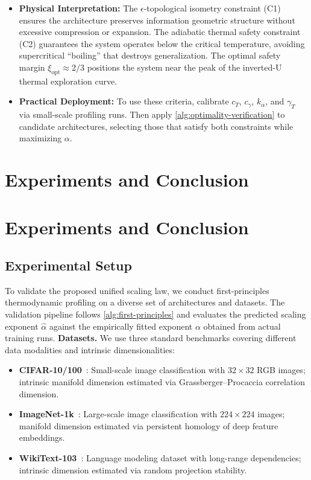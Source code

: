 \documentclass[11pt, a4paper]{article}
\theoremstyle{definition}
\begin{document}
\begin{itemize}
 \item \textbf{Physical Interpretation:} The $\epsilon$-topological isometry constraint (C1) ensures the architecture preserves information geometric structure without excessive compression or expansion. The adiabatic thermal safety constraint (C2) guarantees the system operates below the critical temperature, avoiding supercritical ``boiling'' that destroys generalization. The optimal safety margin $\xi_{\text{opt}} \approx 2/3$ positions the system near the peak of the inverted-U thermal exploration curve.
 \item \textbf{Practical Deployment:} To use these criteria, calibrate $c_T$, $c_\gamma$, $k_\alpha$, and $\gamma_T$ via small-scale profiling runs. Then apply \cref{alg:optimality-verification} to candidate architectures, selecting those that satisfy both constraints while maximizing $\alpha$.
\end{itemize}

\section{Experiments and Conclusion}
\label{sec:experiments}

\section{Experiments and Conclusion}
\label{sec:experiments}

\subsection{Experimental Setup}
\label{subsec:experimental-setup}
To validate the proposed unified scaling law, we conduct first‑principles thermodynamic profiling on a diverse set of architectures and datasets. The validation pipeline follows \cref{alg:first-principles} and evaluates the predicted scaling exponent $\hat{\alpha}$ against the empirically fitted exponent $\alpha$ obtained from actual training runs.
\textbf{Datasets.} We use three standard benchmarks covering different data modalities and intrinsic dimensionalities:
\begin{itemize}
    \item \textbf{CIFAR-10/100}~\cite{krizhevsky2009learning}: Small-scale image classification with $32\times32$ RGB images; intrinsic manifold dimension estimated via Grassberger–Procaccia correlation dimension.
    \item \textbf{ImageNet-1k}~\cite{deng2009imagenet}: Large-scale image classification with $224\times224$ images; manifold dimension estimated via persistent homology of deep feature embeddings.
    \item \textbf{WikiText-103}~\cite{merity2016pointer}: Language modeling dataset with long-range dependencies; intrinsic dimension estimated via random projection stability.
\end{itemize}
\end{document}
